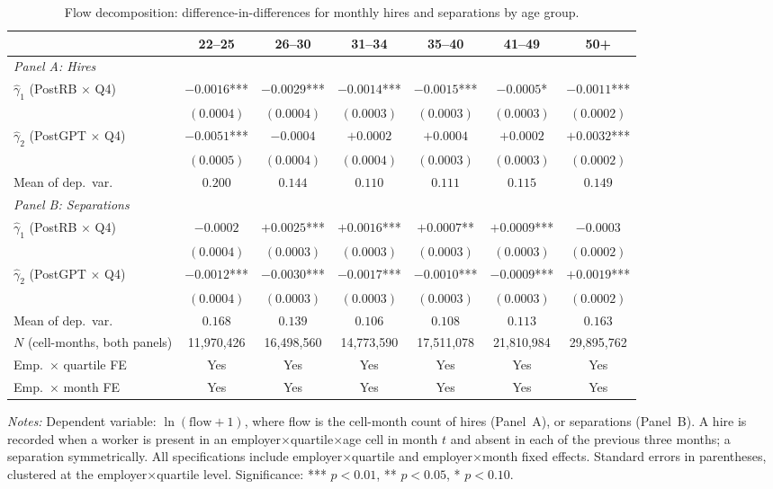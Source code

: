 \documentclass[preprint,12pt,authoryear]{elsarticle}
\begin{document}
\begin{landscape}
\begin{table}[htbp]
\centering
\caption{Flow decomposition: difference-in-differences for monthly hires and separations by age group.}
\label{tab:hires_separations}
\footnotesize
\begin{tabular}{@{}lcccccc@{}}
\toprule
 & 22--25 & 26--30 & 31--34 & 35--40 & 41--49 & 50+ \\
\midrule
\multicolumn{7}{l}{\emph{Panel A: Hires}} \\[2pt]
$\hat\gamma_1$ (PostRB $\times$ Q4) & $-0.0016$*** & $-0.0029$*** & $-0.0014$*** & $-0.0015$*** & $-0.0005$* & $-0.0011$*** \\
 & $(0.0004)$ & $(0.0004)$ & $(0.0003)$ & $(0.0003)$ & $(0.0003)$ & $(0.0002)$ \\[4pt]
$\hat\gamma_2$ (PostGPT $\times$ Q4) & $-0.0051$*** & $-0.0004$ & $+0.0002$ & $+0.0004$ & $+0.0002$ & $+0.0032$*** \\
 & $(0.0005)$ & $(0.0004)$ & $(0.0004)$ & $(0.0003)$ & $(0.0003)$ & $(0.0002)$ \\[4pt]
Mean of dep.\ var. & $0.200$ & $0.144$ & $0.110$ & $0.111$ & $0.115$ & $0.149$ \\[8pt]
\multicolumn{7}{l}{\emph{Panel B: Separations}} \\[2pt]
$\hat\gamma_1$ (PostRB $\times$ Q4) & $-0.0002$ & $+0.0025$*** & $+0.0016$*** & $+0.0007$** & $+0.0009$*** & $-0.0003$ \\
 & $(0.0004)$ & $(0.0003)$ & $(0.0003)$ & $(0.0003)$ & $(0.0003)$ & $(0.0002)$ \\[4pt]
$\hat\gamma_2$ (PostGPT $\times$ Q4) & $-0.0012$*** & $-0.0030$*** & $-0.0017$*** & $-0.0010$*** & $-0.0009$*** & $+0.0019$*** \\
 & $(0.0004)$ & $(0.0003)$ & $(0.0003)$ & $(0.0003)$ & $(0.0003)$ & $(0.0002)$ \\[4pt]
Mean of dep.\ var. & $0.168$ & $0.139$ & $0.106$ & $0.108$ & $0.113$ & $0.163$ \\[8pt]
$N$ (cell-months, both panels) & 11{,}970{,}426 & 16{,}498{,}560 & 14{,}773{,}590 & 17{,}511{,}078 & 21{,}810{,}984 & 29{,}895{,}762 \\
\midrule
Emp.\ $\times$ quartile FE & Yes & Yes & Yes & Yes & Yes & Yes \\
Emp.\ $\times$ month FE & Yes & Yes & Yes & Yes & Yes & Yes \\
\bottomrule
\end{tabular}
\par\medskip
\noindent\parbox{\linewidth}{\raggedright\scriptsize \emph{Notes:} Dependent variable: $\ln(\text{flow}+1)$, where flow is the cell-month count of hires (Panel~A), or separations (Panel~B). A hire is recorded when a worker is present in an employer$\times$quartile$\times$age cell in month $t$ and absent in each of the previous three months; a separation symmetrically. All specifications include employer$\times$quartile and employer$\times$month fixed effects. Standard errors in parentheses, clustered at the employer$\times$quartile level. Significance: *** $p<0.01$, ** $p<0.05$, * $p<0.10$.}

\end{table}
\end{landscape}
\end{document}
